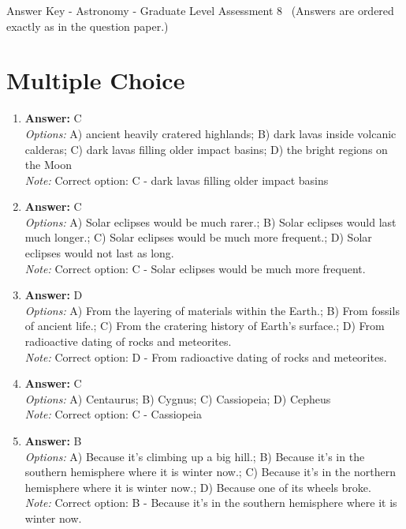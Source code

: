 \documentclass[12pt]{article}
\begin{document}
\begin{center}
Answer Key - Astronomy - Graduate Level Assessment 8 \
\small (Answers are ordered exactly as in the question paper.)
\end{center}

\section*{Multiple Choice}
\begin{enumerate}[label=\arabic*.]
\item \textbf{Answer:} C
\\ \textit{Options:} A) ancient heavily cratered highlands; B) dark lavas inside volcanic calderas; C) dark lavas filling older impact basins; D) the bright regions on the Moon
\\ \textit{Note:} Correct option: C - dark lavas filling older impact basins
\item \textbf{Answer:} C
\\ \textit{Options:} A) Solar eclipses would be much rarer.; B) Solar eclipses would last much longer.; C) Solar eclipses would be much more frequent.; D) Solar eclipses would not last as long.
\\ \textit{Note:} Correct option: C - Solar eclipses would be much more frequent.
\item \textbf{Answer:} D
\\ \textit{Options:} A) From the layering of materials within the Earth.; B) From fossils of ancient life.; C) From the cratering history of Earth's surface.; D) From radioactive dating of rocks and meteorites.
\\ \textit{Note:} Correct option: D - From radioactive dating of rocks and meteorites.
\item \textbf{Answer:} C
\\ \textit{Options:} A) Centaurus; B) Cygnus; C) Cassiopeia; D) Cepheus
\\ \textit{Note:} Correct option: C - Cassiopeia
\item \textbf{Answer:} B
\\ \textit{Options:} A) Because it's climbing up a big hill.; B) Because it's in the southern hemisphere where it is winter now.; C) Because it's in the northern hemisphere where it is winter now.; D) Because one of its wheels broke.
\\ \textit{Note:} Correct option: B - Because it's in the southern hemisphere where it is winter now.
\end{enumerate}
\end{document}
